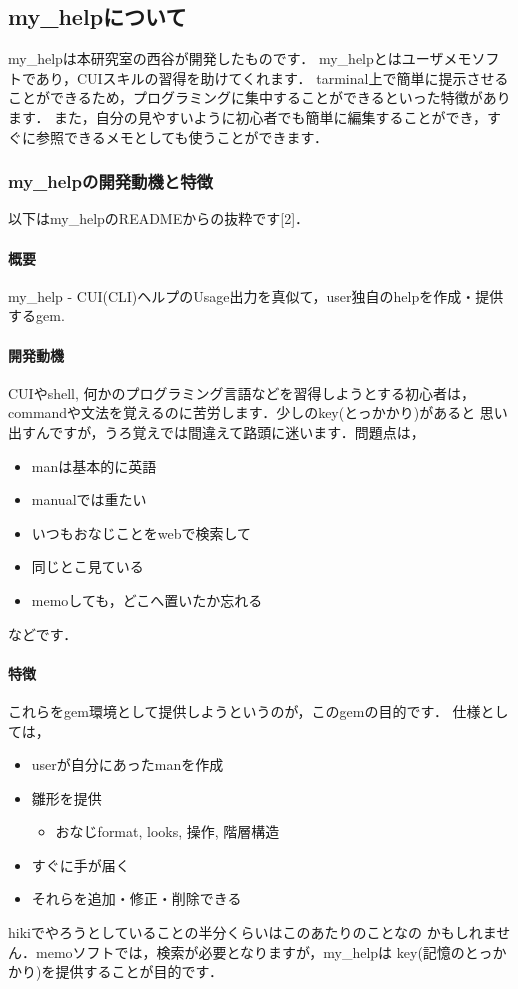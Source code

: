 
\subsection{my\_helpについて}
my\_helpは本研究室の西谷が開発したものです．
my\_helpとはユーザメモソフトであり，CUIスキルの習得を助けてくれます．
tarminal上で簡単に提示させることができるため，プログラミングに集中することができるといった特徴があります．
また，自分の見やすいように初心者でも簡単に編集することができ，すぐに参照できるメモとしても使うことができます．

\subsubsection{my\_helpの開発動機と特徴}
以下はmy\_helpのREADMEからの抜粋です[2]．

\paragraph{概要}
my\_help - CUI(CLI)ヘルプのUsage出力を真似て，user独自のhelpを作成・提供するgem.

\paragraph{開発動機}
CUIやshell, 何かのプログラミング言語などを習得しようとする初心者は，
commandや文法を覚えるのに苦労します．少しのkey(とっかかり)があると
思い出すんですが，うろ覚えでは間違えて路頭に迷います．問題点は，

\begin{itemize}
\item manは基本的に英語
\item manualでは重たい
\item いつもおなじことをwebで検索して
\item 同じとこ見ている
\item memoしても，どこへ置いたか忘れる
\end{itemize}
などです．

\paragraph{特徴}
これらをgem環境として提供しようというのが，このgemの目的です．
仕様としては，

\begin{itemize}
\item userが自分にあったmanを作成
\item 雛形を提供
\begin{itemize}
\item おなじformat, looks, 操作, 階層構造
\end{itemize}
\item すぐに手が届く
\item それらを追加・修正・削除できる
\end{itemize}
hikiでやろうとしていることの半分くらいはこのあたりのことなの
かもしれません．memoソフトでは，検索が必要となりますが，my\_helpは
key(記憶のとっかかり)を提供することが目的です．

